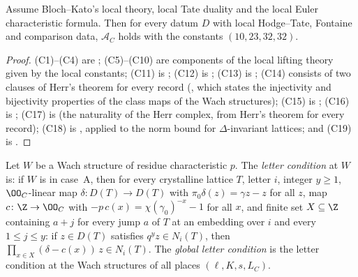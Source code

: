 \begin{theorem}\label{pf:linkN-adm:admC}
Assume Bloch--Kato's local theory, local Tate duality and the local Euler characteristic formula. Then for every datum $D$
with local Hodge--Tate, Fontaine and comparison data, $\mathcal A_C$ holds with the constants $(10,23,32,32)$.
\end{theorem}

\begin{proof}
(C1)--(C4) are ; (C5)--(C10) are components of the local
lifting theory given by the local constants; (C11) is ; (C12) is
; (C13) is
; (C14) consists of two clauses of Herr's theorem for every record
(, which states the injectivity and bijectivity properties of the
class maps of the Wach structures); (C15) is ; (C16) is
; (C17) is
 (the naturality of the Herr complex,
from Herr's theorem for every record); (C18) is
, applied to the norm bound for
$\Delta$-invariant lattices; and (C19) is .
\end{proof}

\begin{definition}\label{pf:linkN-adm:def-letter}
Let $W$ be a Wach structure of residue characteristic $p$. The \emph{letter condition} at $W$ is: if $W$ is in case~A,
then for every crystalline lattice $T$, letter $i$, integer $y\ge1$, $\OO_C$-linear map $\delta\colon D(T)\to D(T)$ with
$\pi_0\delta(z)=\gamma z-z$ for all $z$, map $c\colon\Z\to\OO_C$ with $-p\,c(x)=\chi(\gamma_0)^{-x}-1$ for all $x$, and finite
set $X\subseteq\Z$ containing $a+j$ for every jump $a$ of $T$ at an embedding over $i$ and every $1\le j\le y$: if $z\in D(T)$
satisfies $q^yz\in N_i(T)$, then $\prod_{x\in X}(\delta-c(x))\,z\in N_i(T)$. The \emph{global letter condition} is the
letter condition at the Wach structures of all places $(\ell,K,s,L_C)$.
\end{definition}

